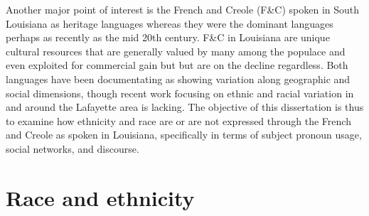   Another major point of interest is the French and Creole (F\&C) spoken in South Louisiana as heritage languages whereas they were the dominant languages perhaps as recently as the mid 20th century.
  F\&C in Louisiana are unique cultural resources that are generally valued by many among the populace and even exploited for commercial gain but but are on the decline regardless.
  Both languages have been documentating as showing variation along geographic and social dimensions, though recent work focusing on ethnic and racial variation in and around the Lafayette area is lacking.
  The objective of this dissertation is thus to examine how ethnicity and race are or are not expressed through the French and Creole as spoken in Louisiana, specifically in terms of subject pronoun usage, social networks, and discourse.

  \section{Race and ethnicity}
    \label{sec:race_ethnicity}
    
